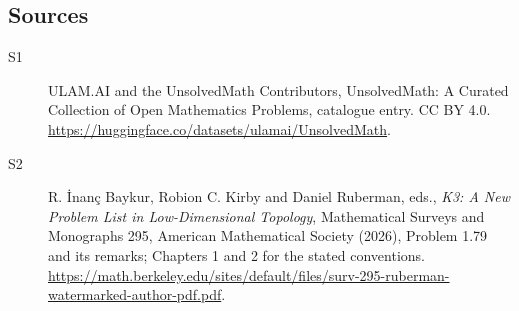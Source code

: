 \documentclass[11pt]{article}
\begin{document}
\subsection{Sources}
\begin{description}
\item[\hypertarget{source:statement:1}{S1}] ULAM.AI and the UnsolvedMath Contributors, UnsolvedMath: A Curated Collection of Open Mathematics Problems, catalogue entry. CC BY 4.0. \url{https://huggingface.co/datasets/ulamai/UnsolvedMath}.
\item[\hypertarget{source:statement:2}{S2}] R. İnanç Baykur, Robion C. Kirby and Daniel Ruberman, eds., \emph{K3: A New Problem List in Low-Dimensional Topology}, Mathematical Surveys and Monographs 295, American Mathematical Society (2026), Problem 1.79 and its remarks; Chapters 1 and 2 for the stated conventions. \url{https://math.berkeley.edu/sites/default/files/surv-295-ruberman-watermarked-author-pdf.pdf}.
\end{description}
\label{end:statement}
\end{document}
